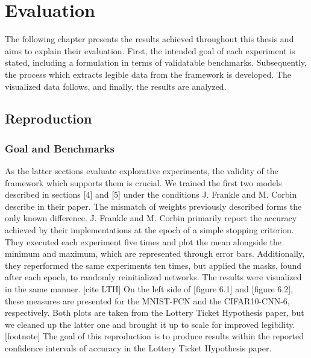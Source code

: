 \chapter{Evaluation}
\label{ch:evaluation}
The following chapter presents the results achieved throughout this thesis and aims to explain their evaluation. First, the intended goal of each experiment is stated, including a  formulation in terms of validatable benchmarks. Subsequently, the process which extracts legible data from the framework is developed. The visualized data follows, and finally, the results are analyzed.

\section{Reproduction}
\subsection*{Goal and Benchmarks}
As the latter sections evaluate explorative experiments, the validity of the framework which supports them is crucial. We trained the first two models described in sections [4] and [5] under the conditions J. Frankle and M. Corbin describe in their paper. The mismatch of weights previously described forms the only known difference.
J. Frankle and M. Corbin primarily report the accuracy achieved by their implementations at the epoch of a simple stopping criterion. They executed each experiment five times and plot the mean alongside the minimum and maximum, which are represented through error bars. Additionally, they reperformed the same experiments ten times, but applied the masks, found after each epoch, to randomly reinitialized networks. The results were visualized in the same manner. [cite LTH]
On the left side of [figure 6.1] and [figure 6.2], these measures are presented for the MNIST-FCN and the CIFAR10-CNN-6, respectively. Both plots are taken from the Lottery Ticket Hypothesis paper, but we cleaned up the latter one and brought it up to scale for improved legibility.[footnote]  The goal of this reproduction is to produce results within the reported confidence intervals of accuracy in the Lottery Ticket Hypothesis paper.  

